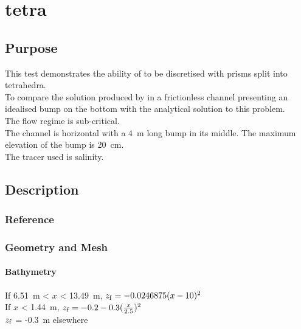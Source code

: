 \chapter{tetra}
%
%
\section{Purpose}
%
This test demonstrates the ability of  to be discretised
with prisms split into tetrahedra.\\
To compare the solution produced by  in a frictionless
channel presenting an idealised bump on the bottom with the analytical
solution to this problem.\\
The flow regime is sub-critical.\\
The channel is horizontal with a 4~m long bump in its middle.
The maximum elevation of the bump is 20~cm.\\
The tracer used is salinity.
%
\section{Description}
%

%
%
%
%
\subsection{Reference}
%

%
%
%
\subsection{Geometry and Mesh}
%
\subsubsection{Bathymetry}
%
If 6.51~m < $x$ < 13.49~m, $z_{\rm{f}} = -0.0246875(x-10)^2$\\
If $x$ < 1.44~m, $z_{\rm{f}} = -0.2-0.3(\frac{x}{2.5})^2$\\
$z_{\rm{f}}$ = -0.3~m elsewhere
%
